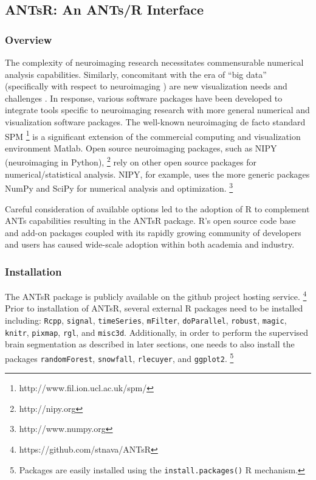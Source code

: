 \documentclass[final,5p,times,twocolumn]{elsarticle}
\begin{document}
\subsection{ANTsR:  An ANTs/R Interface}

\subsubsection{Overview}

The complexity of neuroimaging research necessitates 
commensurable numerical analysis capabilities.  Similarly, concomitant
with the era of ``big data'' (specifically with respect to neuroimaging
\citep{vanhorn2013}) are new visualization needs and challenges
\citep{childs2013,kehrer2013}.
In response, various software packages have been developed to
integrate tools specific to neuroimaging research with more general
numerical and visualization software packages.
The well-known neuroimaging de facto standard SPM%
\footnote{
http://www.fil.ion.ucl.ac.uk/spm/
}
is a significant extension of the commercial computing and visualization environment
Matlab.  Open source neuroimaging packages, such as NIPY (neuroimaging in Python),%
\footnote{
http://nipy.org
} 
rely on other open source packages for numerical/statistical analysis.  NIPY,
for example, uses the more generic packages NumPy and SciPy for numerical analysis and 
optimization.%
\footnote{
http://www.numpy.org
}  

Careful consideration of available options
led to the adoption of R to complement ANTs capabilities resulting in the
ANTsR package.
R's open source code base
and add-on packages coupled with its rapidly growing 
community of developers and users has caused wide-scale
adoption within both academia and industry.

\subsubsection{Installation}

The ANTsR package is publicly available on the github project hosting service.%
\footnote{
https://github.com/stnava/ANTsR
}
Prior to installation of ANTsR, several external R packages
need to be installed including: \verb#Rcpp#, \verb#signal#, \verb#timeSeries#, 
\verb#mFilter#, \verb#doParallel#, \verb#robust#, \verb#magic#, \verb#knitr#, \verb#pixmap#, 
\verb#rgl#, and \verb#misc3d#.  Additionally, in order
to perform the supervised brain segmentation as described 
in later sections, one needs to also install the packages
\verb#randomForest#, \verb#snowfall#, \verb#rlecuyer#,
and \verb#ggplot2#.%
\footnote{
Packages are easily installed using the {\tt install.packages()} R mechanism.
} 
\end{document}

